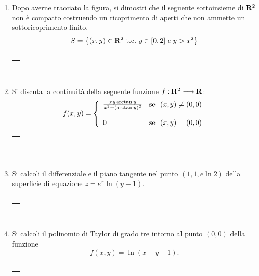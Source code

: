 \documentclass[12pt,a4paper]{report}\pagenumbering{roman}
\begin{document}
\begin{enumerate}
\item Dopo averne tracciato la figura, si dimostri che il seguente sottoinsieme
di ${\bf R}^2$ non \`e compatto costruendo un ricoprimento di aperti che non
ammette un sottoricoprimento finito.
$$S=\left\{(x,y)\in{\bf R}^2\ \mbox{t.c.}\ y\in[0,2]\ \mbox{e}\ y>x^2\right\}$$
\hspace*{-3.5cm}\begin{tabular}{c}\hline\\\hspace*{16cm}\end{tabular}\\
\hspace*{-3.5cm}{\bf SVOLGIMENTO:}\pagebreak 

\item Si discuta la continuit\`a della seguente funzione $f:{\bf R}^2\longrightarrow
{\bf R}$:
$$f(x,y)=\left\{\begin{array}{ll} {xy\arctan{y}\over x^2+(\arctan{y})^2} & 
\mbox{se}\ \ (x,y)\neq (0,0)\\ \\0&\mbox{se}\ \ (x,y)=(0,0)\end{array}\right.$$
\hspace*{-3.5cm}\begin{tabular}{c}\hline\\\hspace*{16cm}\end{tabular}\\
\hspace*{-3.5cm}{\bf SVOLGIMENTO:}\pagebreak

\item Si calcoli il differenziale e il piano tangente nel punto $(1,1,e\ln2)$
della superficie di equazione $z=e^x\ln(y+1)$.\\
\hspace*{-3.5cm}\begin{tabular}{c}\hline\\\hspace*{16cm}\end{tabular}\\
\hspace*{-3.5cm}{\bf SVOLGIMENTO:}\pagebreak

\item Si calcoli il polinomio di Taylor di grado tre intorno al punto $(0,0)$
della funzione 
$$f(x,y)=\ln(x-y+1).$$
\hspace*{-3.5cm}\begin{tabular}{c}\hline\\\hspace*{16cm}\end{tabular}\\
\hspace*{-3.5cm}{\bf SVOLGIMENTO:}\pagebreak


\end{enumerate}
\end{document}

